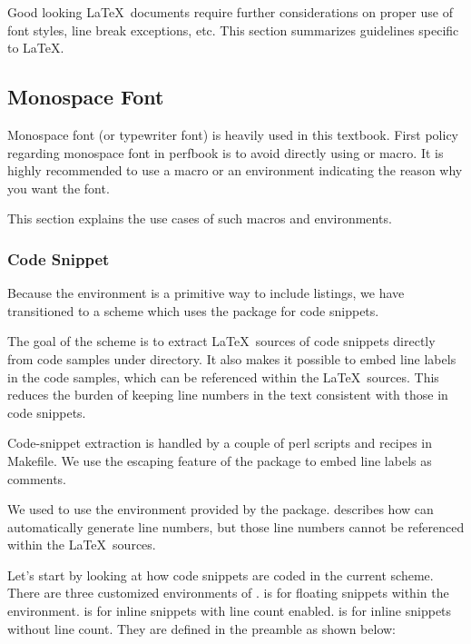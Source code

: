Good looking \LaTeX\ documents require further considerations
on proper use of font styles, line break exceptions, etc.
This section summarizes guidelines specific to \LaTeX.

\subsection{Monospace Font}
\label{sec:app:styleguide:Monospace Font}

Monospace font (or typewriter font) is heavily used in this textbook.
First policy regarding monospace font in perfbook is to avoid
directly using \qco{\\texttt} or \qco{\\tt} macro.
It is highly recommended to use a macro or an environment
indicating the reason why you want the font.

This section explains the use cases of such macros and environments.

\subsubsection{Code Snippet}
\label{sec:app:styleguide:Code Snippet}

Because the  environment is a primitive way to include
listings, we have transitioned to a scheme which uses
the  package for code snippets.

The goal of the scheme is to extract \LaTeX\ sources of
code snippets directly from code samples under 
directory.
It also makes it possible to embed line labels in the code samples,
which can be referenced within the \LaTeX\ sources.
This reduces the burden of keeping line numbers
in the text consistent with those in code snippets.

Code-snippet extraction is handled by a couple of
perl scripts and recipes in Makefile.
We use the escaping feature of the  package
to embed line labels as comments.

We used to use the  environment provided
by the  package.
 describes how
 can automatically generate line numbers,
but those line numbers cannot be referenced within the \LaTeX\ sources.

Let's start by looking at how code snippets are coded in the current scheme.
There are three customized environments of .
 is for floating snippets within the 
environment.
 is for inline snippets with line count enabled.
 is for inline snippets without line count.
They are defined in the preamble as shown below:

